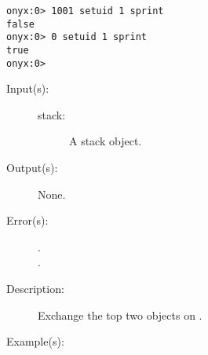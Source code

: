 \begin{description}
\begin{description}
\begin{verbatim}
onyx:0> 1001 setuid 1 sprint
false
onyx:0> 0 setuid 1 sprint
true
onyx:0>
		\end{verbatim}
	\end{description}
\label{systemdict:sexch}
\item[{\onyxop{stack}{sexch}{--}}: ]
	\begin{description}\item[]
	\item[Input(s): ]
		\begin{description}\item[]
		\item[stack: ]
			A stack object.
		\end{description}
	\item[Output(s): ] None.
	\item[Error(s): ]
		\begin{description}\item[]
		\item[.]
		\item[.]
		\end{description}
	\item[Description: ]
		Exchange the top two objects on .
	\item[Example(s): ]\begin{verbatim}


\end{verbatim}
\end{description}
\end{description}
